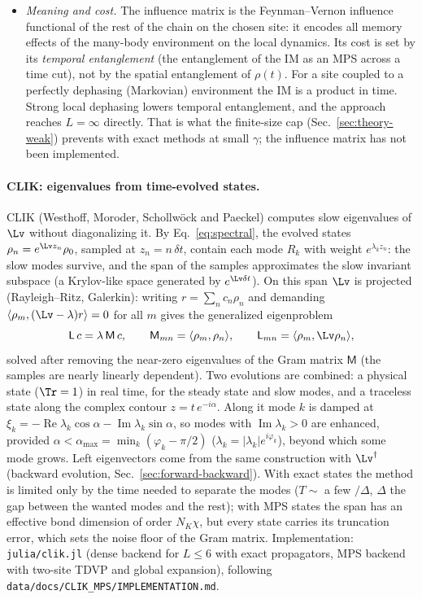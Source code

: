 \begin{itemize}
\item \emph{Meaning and cost.} The influence matrix is the Feynman--Vernon influence functional of the rest of the chain on the chosen site: it encodes all memory effects of the many-body environment on the local dynamics. Its cost is set by its \emph{temporal entanglement} (the entanglement of the IM as an MPS across a time cut), not by the spatial entanglement of $\rho(t)$. For a site coupled to a perfectly dephasing (Markovian) environment the IM is a product in time. Strong local dephasing lowers temporal entanglement, and the approach reaches $L = \infty$ directly. That is what the finite-size cap (Sec.~\ref{sec:theory-weak}) prevents with exact methods at small $\gamma$; the influence matrix has not been implemented.
\end{itemize}

\paragraph{CLIK: eigenvalues from time-evolved states.} CLIK (Westhoff, Moroder, Schollw\"ock and Paeckel) computes slow eigenvalues of $\Lv$ without diagonalizing it. By Eq.~\eqref{eq:spectral}, the evolved states $\rho_n = e^{\Lv z_n}\rho_0$, sampled at $z_n = n\,\delta t$, contain each mode $R_k$ with weight $e^{\lambda_kz_n}$: the slow modes survive, and the span of the samples approximates the slow invariant subspace (a Krylov-like space generated by $e^{\Lv\delta t}$). On this span $\Lv$ is projected (Rayleigh--Ritz, Galerkin): writing $r = \sum_nc_n\rho_n$ and demanding $\langle\rho_m, (\Lv - \lambda)r\rangle = 0$ for all $m$ gives the generalized eigenproblem
\begin{equation}
\mathsf L\,c = \lambda\,\mathsf M\,c, \qquad \mathsf M_{mn} = \langle\rho_m, \rho_n\rangle, \qquad \mathsf L_{mn} = \langle\rho_m, \Lv\rho_n\rangle,
\end{equation}
solved after removing the near-zero eigenvalues of the Gram matrix $\mathsf M$ (the samples are nearly linearly dependent). Two evolutions are combined: a physical state ($\Tr = 1$) in real time, for the steady state and slow modes, and a traceless state along the complex contour $z = t\,e^{-i\alpha}$. Along it mode $k$ is damped at $\xi_k = -\operatorname{Re}\lambda_k\cos\alpha - \operatorname{Im}\lambda_k\sin\alpha$, so modes with $\operatorname{Im}\lambda_k > 0$ are enhanced, provided $\alpha < \alpha_{\max} = \min_k(\varphi_k - \pi/2)$ ($\lambda_k = |\lambda_k|e^{i\varphi_k}$), beyond which some mode grows. Left eigenvectors come from the same construction with $\Lv^\dagger$ (backward evolution, Sec.~\ref{sec:forward-backward}). With exact states the method is limited only by the time needed to separate the modes ($T \sim$ a few $/\Delta$, $\Delta$ the gap between the wanted modes and the rest); with MPS states the span has an effective bond dimension of order $N_K\chi$, but every state carries its truncation error, which sets the noise floor of the Gram matrix. Implementation: \texttt{julia/clik.jl} (dense backend for $L \le 6$ with exact propagators, MPS backend with two-site TDVP and global expansion), following \texttt{data/docs/CLIK\_MPS/IMPLEMENTATION.md}.


